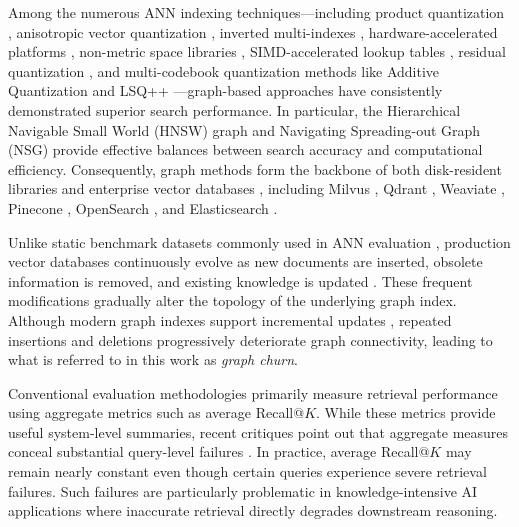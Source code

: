 \documentclass{ieeeaccess}
\begin{document}
Among the numerous ANN indexing techniques---including product quantization \cite{PQ2011, Matsui2018}, anisotropic vector quantization \cite{ScaNN2020, Guo2020_45}, inverted multi-indexes \cite{Babenko2015}, hardware-accelerated platforms \cite{FAISS2019}, non-metric space libraries \cite{Boytsov2013}, SIMD-accelerated lookup tables \cite{Andre2019}, residual quantization \cite{Liu2015}, and multi-codebook quantization methods like Additive Quantization \cite{Martinez2016} and LSQ++ \cite{Martinez2018}---graph-based approaches have consistently demonstrated superior search performance. In particular, the Hierarchical Navigable Small World (HNSW) graph \cite{Malkov2020} and Navigating Spreading-out Graph (NSG) \cite{NSG2019, Fu2023} provide effective balances between search accuracy and computational efficiency. Consequently, graph methods form the backbone of both disk-resident libraries \cite{DiskANN2020, MicrosoftDiskANN, FreshDiskANN2022} and enterprise vector databases \cite{HAKES2025}, including Milvus \cite{Milvus}, Qdrant \cite{Qdrant}, Weaviate \cite{Weaviate}, Pinecone \cite{Pinecone}, OpenSearch \cite{OpenSearch}, and Elasticsearch \cite{Elastic}.

Unlike static benchmark datasets commonly used in ANN evaluation \cite{ANNBenchmarks2020, ANNBenchmarks2022, Aumuller2020_46, Simhadri2023, Simhadri2024}, production vector databases continuously evolve as new documents are inserted, obsolete information is removed, and existing knowledge is updated \cite{Xu2023, FreshDiskANN2022}. These frequent modifications gradually alter the topology of the underlying graph index. Although modern graph indexes support incremental updates \cite{Xu2025, CleanNN2025}, repeated insertions and deletions progressively deteriorate graph connectivity, leading to what is referred to in this work as \emph{graph churn}.

Conventional evaluation methodologies primarily measure retrieval performance using aggregate metrics such as average Recall@$K$. While these metrics provide useful system-level summaries, recent critiques point out that aggregate measures conceal substantial query-level failures \cite{Robust2025}. In practice, average Recall@$K$ may remain nearly constant even though certain queries experience severe retrieval failures. Such failures are particularly problematic in knowledge-intensive AI applications where inaccurate retrieval directly degrades downstream reasoning.
\end{document}
